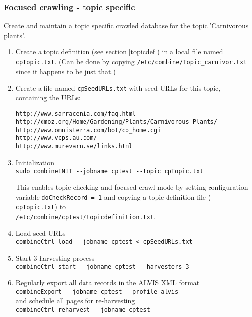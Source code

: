 \subsubsection{Focused crawling - topic specific}

Create and maintain a topic specific crawled database for the topic 'Carnivorous plants'.

\begin{enumerate}
\item Create a topic definition (see section \ref{topicdef}) in a local file named {\tt cpTopic.txt}. (Can be done by copying {\tt /etc/combine/Topic\_carnivor.txt} since it happens to be just that.)

\item Create a file named {\tt cpSeedURLs.txt} with seed URLs for this
topic, containing the URLs:
\begin{verbatim}
http://www.sarracenia.com/faq.html
http://dmoz.org/Home/Gardening/Plants/Carnivorous_Plants/
http://www.omnisterra.com/bot/cp_home.cgi
http://www.vcps.au.com/
http://www.murevarn.se/links.html
\end{verbatim}


\item Initialization\\
{\tt  sudo combineINIT \verb+--+jobname cptest \verb+--+topic cpTopic.txt}

 This enables topic checking and focused crawl mode by setting
configuration variable {\tt doCheckRecord = 1} and copying a topic definition file ({\tt
cpTopic.txt}) to\\ {\tt /etc/combine/cptest/topicdefinition.txt}.

\item Load seed URLs\\
{\tt  combineCtrl  load \verb+--+jobname cptest < cpSeedURLs.txt}

\item  Start 3 harvesting process\\
{\tt  combineCtrl  start \verb+--+jobname cptest \verb+--+harvesters 3}

\item  Regularly export all data records in the ALVIS XML format\\
{\tt  combineExport \verb+--+jobname cptest \verb+--+profile alvis}\\
and schedule all pages for re-harvesting\\
{\tt combineCtrl reharvest \verb+--+jobname cptest}

\end{enumerate}
